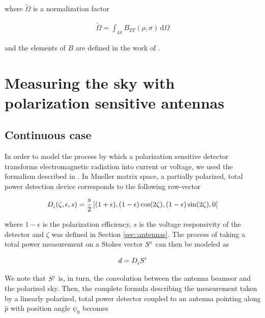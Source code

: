 \documentclass[a4paper,11pt]{article}
\begin{document}
\noindent
where $\tilde{\Omega}$ is a normalization factor

\begin{equation}
\begin{aligned}
\tilde{\Omega} = \int_{4\pi} B_{TT}(\rho,\sigma) \, \mathrm{d} \Omega
\end{aligned}
\end{equation}

\noindent
and the elements of $B$ are defined in the work of \cite{2007MNRAS.376.1767O}.

\section{Measuring the sky with polarization sensitive antennas}

\subsection{Continuous case}

In order to model the process by which a polarization sensitive detector transforms electromagnetic radiation into current or voltage, we used the formalism described in \cite{2007A&A...470..771J}. In Mueller matrix space, a partially polarized, total power detection device corresponds to the following row-vector 

\begin{equation}
\begin{aligned}
\tensor{D}{_{i}}(\zeta,\epsilon,s) = \frac{s}{2} \left[(1 + \epsilon), (1 - \epsilon)\cos(2\zeta), (1 - \epsilon)\sin(2\zeta), 0 \right]
\end{aligned}
\label{eq::M_pol}
\end{equation}

\noindent
where $1 - \epsilon$ is the polarization efficiency, $s$ is the voltage responsivity of the detector and $\zeta$ was defined in Section \ref{sec::antennas}. The process of taking a total power measurement on a Stokes vector $\tensor{S}{^{i}}$ can then be modeled as

\begin{equation}
\begin{aligned}
d = \tensor{D}{_{i}} \tensor{S}{^{i}}
\end{aligned}
\label{eq::total_power_measurement}
\end{equation}

We note that $\tensor{S}{^{i}}$ is, in turn, the convolution between the antenna beamsor and the polarized sky. Then, the complete formula describing the measurement taken by a linearly polarized, total power detector coupled to an antenna pointing along $\hat{p}$ with position angle $\psi_0$ becomes
\end{document}
